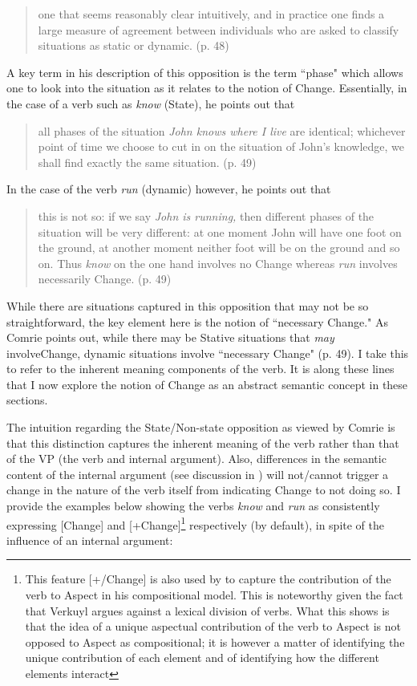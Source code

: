 \begin{quote}
one that seems reasonably clear intuitively, and in practice one finds
a large measure of agreement between individuals who are asked to
classify situations as static or dynamic. (p. 48)
\end{quote}


A key term in his description of this opposition is the term ``phase"
which allows one to look into the situation as it relates to the
notion of Change.  Essentially, in the case of a verb such as \textit{know}
(State), he points out that

\begin{quote}
  all phases of the situation \textit{John knows where I live} are
  identical; whichever point of time we choose to cut in on the
  situation of John’s knowledge, we shall find exactly the same
  situation. (p. 49)
\end{quote}

In the case of the verb \textit{run} (dynamic) however, he points out that

\begin{quote}
this is not so: if we say \textit{John is running,} then different
phases of the situation will be very different: at one moment John
will have one foot on the ground, at another moment neither foot will
be on the ground and so on. Thus \textit{know} on the one hand
involves no Change whereas \textit{run} involves necessarily Change. (p. 49)
\end{quote}

While there are situations captured in this opposition that may not be
so straightforward, the key element here is the notion of ``necessary
Change." As Comrie points out, while there may be Stative situations
that \textit{may} involve\linebreak Change, dynamic situations involve
``necessary Change" (p. 49). I take this to refer to the inherent
meaning components of the verb.  It is along these lines that I now
explore the notion of Change as an abstract semantic concept in these
sections.

The intuition regarding the State\slash Non-state opposition as viewed by
Comrie is that this distinction captures the inherent meaning of the
verb rather than that of the VP (the verb and internal argument).
Also, differences in the semantic content of the internal argument
(see discussion in ) will not\slash cannot trigger a change in
the nature of the verb itself from indicating Change to not doing so.
I provide the examples below showing the verbs \textit{know} and \textit{run} as
consistently expressing [\textminus Change] and [+Change]\footnote{This feature
  [+/\textminus Change] is also used by \citet{Verkuyl1999} to capture the
  contribution of the verb to Aspect in his compositional model. This
  is noteworthy given the fact that Verkuyl argues against a lexical
  division of verbs.  What this shows is that the idea of a unique
  aspectual contribution of the verb to Aspect is not opposed to
  Aspect as compositional; it is however a matter of identifying the
  unique contribution of each element and of identifying how the
  different elements interact} respectively (by default), in spite of
the influence of an internal argument:

